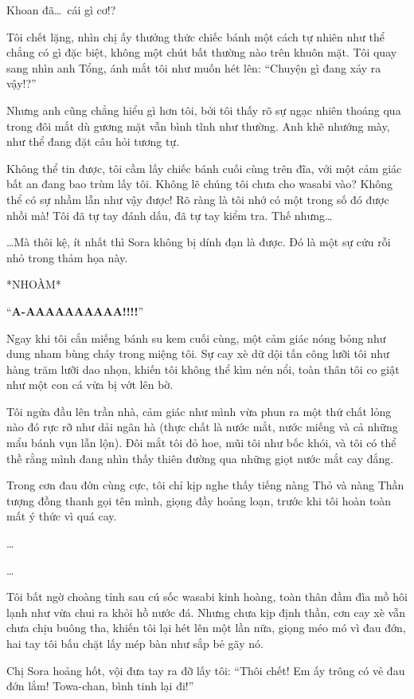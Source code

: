 \documentclass[../main.tex]{subfiles}
\begin{document}
Khoan đã\dots\ cái gì cơ!?

Tôi chết lặng, nhìn chị ấy thưởng thức chiếc bánh một cách tự nhiên như thể chẳng có gì đặc biệt, không một chút bất thường nào trên khuôn mặt. Tôi quay sang nhìn anh Tổng, ánh mắt tôi như muốn hét lên: ``Chuyện gì đang xảy ra vậy!?''

Nhưng anh cũng chẳng hiểu gì hơn tôi, bởi tôi thấy rõ sự ngạc nhiên thoáng qua trong đôi mắt dù gương mặt vẫn bình tĩnh như thường. Anh khẽ nhướng mày, như thể đang đặt câu hỏi tương tự.

Không thể tin được, tôi cầm lấy chiếc bánh cuối cùng trên đĩa, với một cảm giác bất an đang bao trùm lấy tôi. Không lẽ chúng tôi chưa cho wasabi vào? Không thể có sự nhầm lẫn như vậy được! Rõ ràng là tôi nhớ có một trong số đó được nhồi mà! Tôi đã tự tay đánh dấu, đã tự tay kiểm tra. Thế nhưng\dots

\dots Mà thôi kệ, ít nhất thì Sora không bị dính đạn là được. Đó là một sự cứu rỗi nhỏ trong thảm họa này.

*NHOÀM*

``\textbf{A-AAAAAAAAAA!!!!}''

Ngay khi tôi cắn miếng bánh su kem cuối cùng, một cảm giác nóng bỏng như dung nham bùng cháy trong miệng tôi. Sự cay xè dữ dội tấn công lưỡi tôi như hàng trăm lưỡi dao nhọn, khiến tôi không thể kìm nén nổi, toàn thân tôi co giật như một con cá vừa bị vớt lên bờ.

Tôi ngửa đầu lên trần nhà, cảm giác như mình vừa phun ra một thứ chất lỏng nào đó rực rỡ như dải ngân hà (thực chất là nước mắt, nước miếng và cả những mẩu bánh vụn lẫn lộn). Đôi mắt tôi đỏ hoe, mũi tôi như bốc khói, và tôi có thể thề rằng mình đang nhìn thấy thiên đường qua những giọt nước mắt cay đắng.


Trong cơn đau đớn cùng cực, tôi chỉ kịp nghe thấy tiếng nàng Thỏ và nàng Thần tượng đồng thanh gọi tên mình, giọng đầy hoảng loạn, trước khi tôi hoàn toàn mất ý thức vì quá cay.

\dots

\dots

Tôi bất ngờ choàng tỉnh sau cú sốc wasabi kinh hoàng, toàn thân đầm đìa mồ hôi lạnh như vừa chui ra khỏi hồ nước đá. Nhưng chưa kịp định thần, cơn cay xè vẫn chưa chịu buông tha, khiến tôi lại hét lên một lần nữa, giọng méo mó vì đau đớn, hai tay tôi bấu chặt lấy mép bàn như sắp bẻ gãy nó.

Chị Sora hoảng hốt, vội đưa tay ra đỡ lấy tôi: ``Thôi chết! Em ấy trông có vẻ đau đớn lắm! Towa-chan, bình tinh lại đi!''
\end{document}
